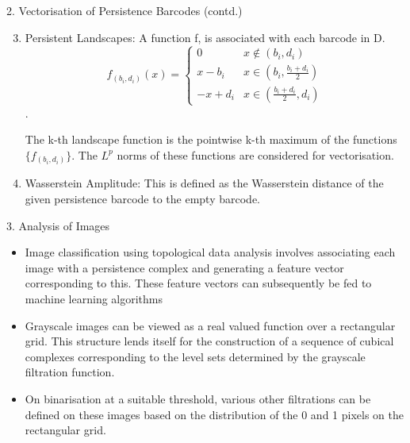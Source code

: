 \documentclass{beamer}
\begin{document}
\begin{frame}{2. Vectorisation of Persistence Barcodes (contd.)}
\begin{enumerate}
\setcounter{enumi}{2}
\item Persistent Landscapes: A function f, is associated with each barcode in D.
\begin{equation}
f_{(b_i,d_i)}(x) = \begin{cases}
 0 & x \notin (b_i,d_i) \\
 x- b_i   & x \in (b_i, \frac{b_i+d_i}{2})\\
 -x + d_i & x \in (\frac{b_i+d_i}{2} , d_i)
\end{cases}
\end{equation}. 

The k-th landscape function is the pointwise k-th maximum of the functions $\{f_{(b_i,d_i)}\}$. The $L^p$ norms of these functions are considered for vectorisation.
\item Wasserstein Amplitude: This is defined as the Wasserstein distance of the given persistence barcode to the empty barcode.
\end{enumerate}
\end{frame}


\begin{frame}{3. Analysis of Images}

\begin{center}
\begin{itemize}
\item Image classification using topological data analysis involves associating each image with a persistence complex and generating a feature vector corresponding to this. These feature vectors can subsequently be fed to machine learning algorithms
\item Grayscale images can be viewed as a real valued function over a rectangular grid. This structure lends itself for the construction of a sequence of cubical complexes corresponding to the level sets determined by the grayscale filtration function.
\item On binarisation at a suitable threshold, various other filtrations can be defined on these images based on the distribution of the 0 and 1 pixels on the rectangular grid. 

\end{itemize}
\end{center}
\end{frame}
\end{document}
